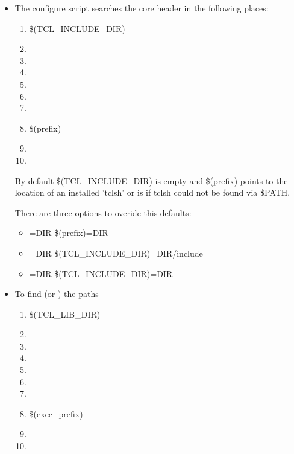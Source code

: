 \begin {itemize}
\item	The configure script searches the core header  in
	the following places:

	\begin {enumerate}
	\item	\$(TCL\_INCLUDE\_DIR)
	\item	{}
	\item	{}
	\item	{}
	\item	{}
	\item	{}
	\item	{}
	\item	\$(prefix)
	\item	{}
	\item	{}
	\end {enumerate}

	By default \$(TCL\_INCLUDE\_DIR) is empty and \$(prefix) points
	to the location of an installed 'tclsh' or is  if
	tclsh could not be found via \$PATH.

	There are three options to overide this defaults:

	\begin {itemize}
	\item[]	=DIR		   \ra {} \$(prefix)=DIR
	\item[]	=DIR		   \ra {} \$(TCL\_INCLUDE\_DIR)=DIR/include
	\item[]	=DIR  \ra {} \$(TCL\_INCLUDE\_DIR)=DIR
	\end {itemize}


\item	To find  (or ) the paths

	\begin {enumerate}
	\item	\$(TCL\_LIB\_DIR)
	\item	{}
	\item	{}
	\item	{}
	\item	{}
	\item	{}
	\item	{}
	\item	\$(exec\_prefix)
	\item	{}
	\item	{}
	\end {enumerate}


\end{itemize}
